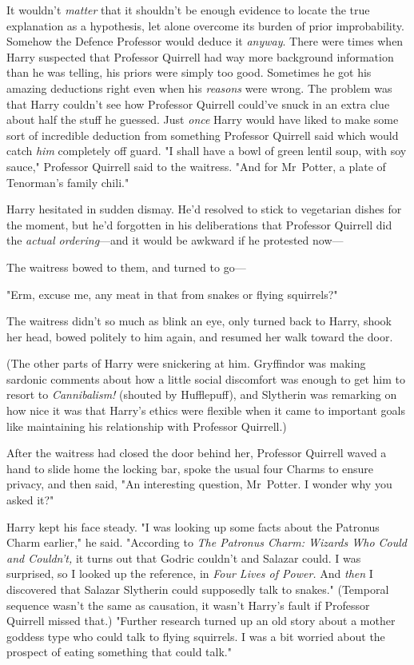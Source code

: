 It wouldn't \emph{matter} that it shouldn't be enough evidence to locate the
true explanation as a hypothesis, let alone overcome its burden of prior
improbability. Somehow the Defence Professor would deduce it \emph{anyway}.
There were times when Harry suspected that Professor Quirrell had way more
background information than he was telling, his priors were simply too good.
Sometimes he got his amazing deductions right even when his \emph{reasons} were
wrong. The problem was that Harry couldn't see how Professor Quirrell could've
snuck in an extra clue about half the stuff he guessed. Just \emph{once} Harry
would have liked to make some sort of incredible deduction from something
Professor Quirrell said which would catch \emph{him} completely off guard.
\later
"I shall have a bowl of green lentil soup, with soy sauce," Professor Quirrell
said to the waitress. "And for Mr~Potter, a plate of Tenorman's family chili."

Harry hesitated in sudden dismay. He'd resolved to stick to vegetarian dishes
for the moment, but he'd forgotten in his deliberations that Professor Quirrell
did the \emph{actual ordering}—and it would be awkward if he protested now—

The waitress bowed to them, and turned to go—

"Erm, excuse me, any meat in that from snakes or flying squirrels?"

The waitress didn't so much as blink an eye, only turned back to Harry, shook
her head, bowed politely to him again, and resumed her walk toward the door.

(The other parts of Harry were snickering at him. Gryffindor was making
sardonic comments about how a little social discomfort was enough to get him to
resort to \emph{Cannibalism!} (shouted by Hufflepuff), and Slytherin was
remarking on how nice it was that Harry's ethics were flexible when it came to
important goals like maintaining his relationship with Professor Quirrell.)

After the waitress had closed the door behind her, Professor Quirrell waved a
hand to slide home the locking bar, spoke the usual four Charms to ensure
privacy, and then said, "An interesting question, Mr~Potter. I wonder why you
asked it?"

Harry kept his face steady. "I was looking up some facts about the Patronus
Charm earlier," he said. "According to \emph{The Patronus Charm: Wizards Who
Could and Couldn't,} it turns out that Godric couldn't and Salazar could. I was
surprised, so I looked up the reference, in \emph{Four Lives of Power.} And
\emph{then} I discovered that Salazar Slytherin could supposedly talk to
snakes." (Temporal sequence wasn't the same as causation, it wasn't Harry's
fault if Professor Quirrell missed that.) "Further research turned up an old
story about a mother goddess type who could talk to flying squirrels. I was a
bit worried about the prospect of eating something that could talk."

